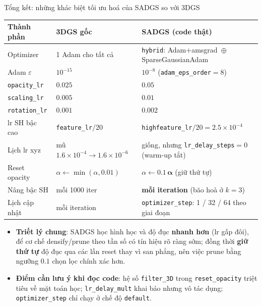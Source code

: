 \begin{frame}{Tổng kết: những khác biệt tối ưu hoá của SADGS so với 3DGS}
\scriptsize
\centering
\begin{tabular}{lll}
\toprule
\textbf{Thành phần} & \textbf{3DGS gốc} & \textbf{SADGS (code thật)} \\
\midrule
Optimizer & 1 Adam cho tất cả & \texttt{hybrid}: Adam+amsgrad \,$\oplus$\, SparseGaussianAdam \\
Adam $\varepsilon$ & $10^{-15}$ & $10^{-8}$ (\texttt{adam\_eps\_order}$=8$) \\
\texttt{opacity\_lr} & $0.025$ & $\mathbf{0.05}$ \\
\texttt{scaling\_lr} & $0.005$ & $\mathbf{0.01}$ \\
\texttt{rotation\_lr} & $0.001$ & $\mathbf{0.002}$ \\
lr SH bậc cao & \texttt{feature\_lr}$/20$ & \texttt{highfeature\_lr}$/20 = 2.5\times10^{-4}$ \\
Lịch lr xyz & mũ $1.6\!\times\!10^{-4}\!\to\!1.6\!\times\!10^{-6}$ & giống, nhưng \texttt{lr\_delay\_steps}$=0$ (warm-up tắt) \\
Reset opacity & $\alpha \leftarrow \min(\alpha, 0.01)$ & $\alpha \leftarrow \mathbf{0.1\,\alpha}$ (giữ thứ tự) \\
Nâng bậc SH & mỗi 1000 iter & \textbf{mỗi iteration} (bão hoà ở $k=3$) \\
Lịch cập nhật & mỗi iteration & \texttt{optimizer\_step}: 1 / 32 / 64 theo giai đoạn \\
\bottomrule
\end{tabular}
\vspace{0.25cm}
\flushleft
\begin{itemize}
    \item \textbf{Triết lý chung}: SADGS học hình học và độ đục \textbf{nhanh hơn} (lr gấp đôi), để cơ chế densify/prune theo tần số có tín hiệu rõ ràng sớm; đồng thời \textbf{giữ thứ tự} độ đục qua các lần reset thay vì san phẳng, nên việc prune bằng ngưỡng $0.1$ chọn lọc chính xác hơn.
    \item \textbf{Điểm cần lưu ý khi đọc code}: hệ số \texttt{filter\_3D} trong \texttt{reset\_opacity} triệt tiêu về mặt toán học; \texttt{lr\_delay\_mult} khai báo nhưng vô tác dụng; \texttt{optimizer\_step} chỉ chạy ở chế độ \texttt{default}.
\end{itemize}
\end{frame}
